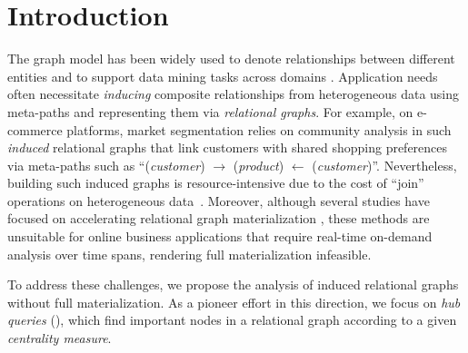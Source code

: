 \section{Introduction}
\label{sec:intro}

The graph model has been widely used to denote relationships between different entities and to support data mining tasks across domains \cite{jiang2024spade+, ji2022detecting, li2024sefraud, liu2022user,niu2024discovering}. Application needs often necessitate \emph{inducing} composite relationships from heterogeneous data using meta-paths \cite{sun2011pathsim, fang2020effective, zheng2017entity} and representing them via \emph{relational graphs}. For example, on e-commerce platforms, market segmentation relies on community analysis in such \emph{induced} relational graphs that link customers with shared shopping preferences via meta-paths such as ``(\emph{customer}) $\rightarrow$ (\emph{product}) $\leftarrow$ (\emph{customer})''. Nevertheless, building such induced graphs is resource-intensive due to the cost of ``\textsf{join}'' operations on heterogeneous data~\cite{xirogiannopoulos2017extracting}. Moreover, although several studies have focused on accelerating relational graph materialization \cite{chatzopoulos2023atrapos, guo2024efficient, shi2016constrained, sun2011pathsim}, these methods are unsuitable for online business applications that require real-time on-demand analysis over time spans, rendering full materialization infeasible.

To address these challenges, we propose the analysis of induced relational graphs without full materialization. As a pioneer effort in this direction, we focus on \emph{hub queries} (\ced), which find important nodes in a relational graph according to a given \emph{centrality measure}.

